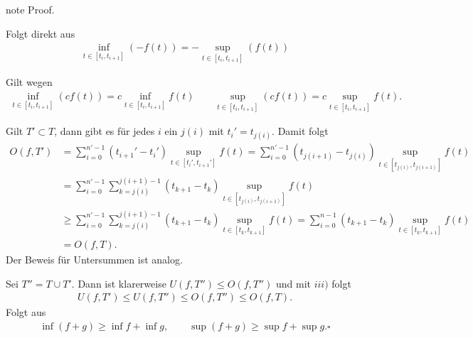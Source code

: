 \documentclass[letterpaper,10pt,english]{jupyterBook}
\begin{document}
\begin{sphinxadmonition}{note}
Proof. 

Folgt direkt aus
\begin{equation*}
\begin{split}\inf_{t \in [t_i,t_{i+1}]}(-f(t)) = - \sup_{t \in [t_i,t_{i+1}]}(f(t))\end{split}
\end{equation*}

Gilt wegen
\begin{equation*}
\begin{split} \inf_{t \in [t_i,t_{i+1}]} (c f(t)) = c \inf_{t \in [t_i,t_{i+1}]} f(t) \qquad \sup_{t \in [t_i,t_{i+1}]} (c f(t)) = c \sup_{t \in [t_i,t_{i+1}]} f(t).\end{split}
\end{equation*}

Gilt \(T' \subset T\), dann gibt es für jedes \(i\) ein \(j(i)\) mit \(t_i' =t_{j(i)}\). Damit folgt
\begin{align*} O(f,T') &= \sum_{i=0}^{n'-1} (t_{i+1}' - t_i') \sup_{t \in  [t_i',t_{i+1}']} f(t) =\sum_{i=0}^{n'-1} (t_{j(i+1)} - t_{j(i)}) \sup_{t \in  [t_{j(i)},t_{j(i+1)}]} f(t) \\
&= \sum_{i=0}^{n'-1} \sum_{k=j(i)}^{j(i+1)-1} (t_{k+1} - t_{k}) \sup_{t \in  [t_{j(i)},t_{j(i+1)}]} f(t)  \\
&\geq \sum_{i=0}^{n'-1} \sum_{k=j(i)}^{j(i+1)-1} (t_{k+1} - t_{k}) \sup_{t \in  [t_{k},t_{k+1}]} f(t)   =\sum_{i=0}^{n-1} (t_{k+1} - t_{k}) \sup_{t \in  [t_{k},t_{k+1}]} f(t)  \\ &= O(f,T).
\end{align*}
Der Beweis für Untersummen ist analog.


Sei \(T''= T \cup T'\). Dann ist klarerweise \(U(f,T'') \leq O(f,T'')\) und mit \(iii)\) folgt
\begin{equation*}
\begin{split} U(f,T') \leq U(f,T'') \leq O(f,T'') \leq O(f,T) .\end{split}
\end{equation*}
Folgt aus
\begin{equation*}
\begin{split} \inf (f+g) \geq \inf f + \inf g, \qquad \sup (f+g) \geq \sup f + \sup g.  \square\end{split}
\end{equation*}\end{sphinxadmonition}
\end{document}
